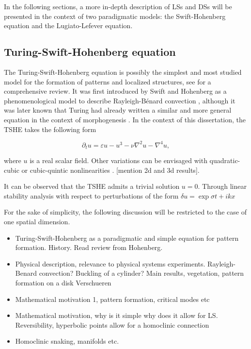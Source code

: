 In the following sections, a more in-depth description of LSs and DSs will be presented 
in the context of two paradigmatic models: the Swift-Hohenberg equation and the Lugiato-Lefever
equation.  


\subsection{Turing-Swift-Hohenberg equation}

The Turing-Swift-Hohenberg equation is possibly the simplest and most studied model 
for the formation of patterns and localized structures, see \cite{cross1993pattern,knobloch2015spatial}
for a comprehensive review. It was first introduced
by Swift and Hohenberg as a phenomenological model to describe Rayleigh-Bénard
convection \cite{swift1977hydrodynamic,pomeau1979stability}, although it was later 
known that Turing had already written 
a similar and more general equation in the context of morphogenesis \cite{dawes2016after}.
In the context of this dissertation, the TSHE takes the following form

\begin{equation}
    \partial_t u = \varepsilon u - u ^3 - \nu \nabla^2 u - \nabla^4 u,
    \label{eq:pre_ls_she}
\end{equation}

where $u$ is a real scalar field. Other variations can be envisaged with
quadratic-cubic or cubic-quintic nonlinearities \cite{knobloch2015spatial}. 
[mention 2d and 3d results].

It can be observed that the TSHE admits a trivial solution $u=0$. Through linear
stability analysis with respect to perturbations of the form $\delta u = \exp{\sigma t + ikx}$

For the sake of simplicity, the following discussion will be restricted to 
the case of one spatial dimension. 

\begin{itemize}
    \item Turing-Swift-Hohenberg as a paradigmatic and simple equation for pattern
formation. History. Read review from Hohenberg.
    \item Physical description, relevance to physical systems experiments. 
    Rayleigh-Benard convection? Buckling of a cylinder? Main results, vegetation,
    pattern formation on a disk Verschueren
    \item Mathematical motivation 1, pattern formation, critical modes etc
    \item Mathematical motivation, why is it simple why does it allow for LS.
Reversibility, hyperbolic points allow for a homoclinic connection
    \item Homoclinic snaking, manifolds etc.
\end{itemize}

